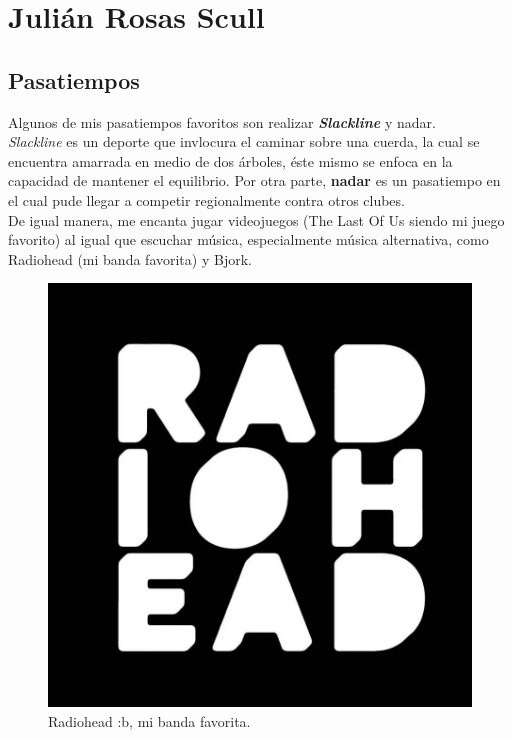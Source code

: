 \chapter{Julián Rosas Scull}

\section{Pasatiempos}

\large
Algunos de mis pasatiempos favoritos son realizar \textbf{\textit{Slackline}} y nadar.
\\

\textit{Slackline} es un deporte que invlocura el caminar sobre una cuerda, la cual se encuentra amarrada en medio de dos árboles, éste mismo se enfoca en
la capacidad de mantener el equilibrio. Por otra parte, \textbf{nadar} es un pasatiempo en el cual pude llegar a competir regionalmente contra otros clubes.
\\

De igual manera, me encanta jugar videojuegos (The Last Of Us siendo mi juego favorito) al igual que escuchar música, especialmente música alternativa,
como Radiohead (mi banda favorita) y Bjork.
\\

\begin{figure}[H]
  \centering
  \includegraphics[scale=0.1]{./radiohead.jpg}
  \caption{Radiohead :b, mi banda favorita.}
  \label{radiohead}
\end{figure}

